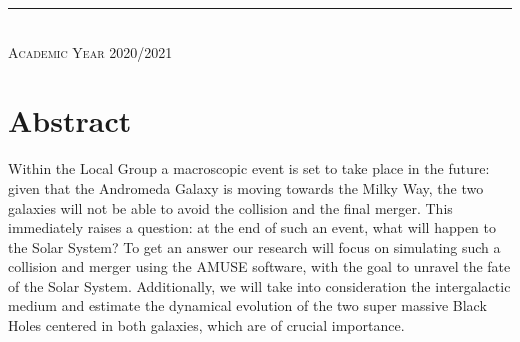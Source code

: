 \documentclass[10pt,english]{article}
\begin{document}
\begin{titlepage}
\begin{center}
\rule{125mm}{0.1mm} \\
\vspace{5pt}
\scshape{\large{Academic Year 2020/2021}} \\

\end{center}
\makeatother
\end{titlepage}


\section{Abstract}
\label{abstract}
Within the Local Group a macroscopic event is set to take place in the future: given that the Andromeda Galaxy is moving towards the Milky Way, the two galaxies will not be able to avoid the collision and the final merger. This immediately raises a question: at the end of such an event, what will happen to the Solar System? To get an answer our research will focus on simulating such a collision and merger using the AMUSE software, with the goal to unravel the fate of the Solar System. Additionally, we will take into consideration the intergalactic medium and estimate the dynamical evolution of the two super massive Black Holes centered in both galaxies, which are of crucial importance.\par %
\smallskip
\end{document}
